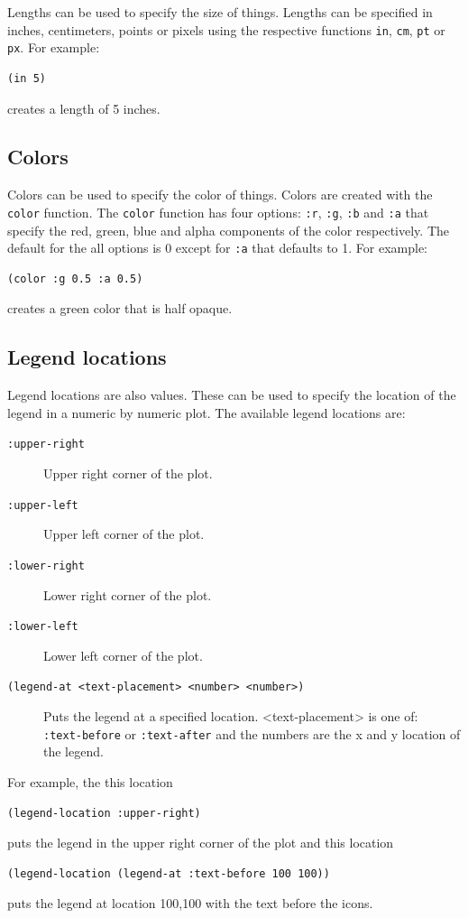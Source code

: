 \documentclass{article}
\begin{document}
Lengths can be used to specify the size of things.  Lengths can be
specified in inches, centimeters, points or pixels using the
respective functions {\tt in}, {\tt cm}, {\tt pt} or {\tt px}.  For
example:
\begin{verbatim}
(in 5)
\end{verbatim}
creates a length of 5 inches.

\subsection{Colors}

Colors can be used to specify the color of things.  Colors are created
with the {\tt color} function.  The {\tt color} function has four
options: {\tt :r}, {\tt :g}, {\tt :b} and {\tt :a} that specify the
red, green, blue and alpha components of the color respectively.  The
default for the all options is 0 except for {\tt :a} that defaults to
1. For example:
\begin{verbatim}
(color :g 0.5 :a 0.5)
\end{verbatim}
creates a green color that is half opaque.


\subsection{Legend locations}

Legend locations are also values.  These can be used to specify the
location of the legend in a numeric by numeric plot.  The available
legend locations are:
\begin{description}
\item[{\tt :upper-right}] Upper right corner of the plot.
\item[{\tt :upper-left}] Upper left corner of the plot.
\item[{\tt :lower-right}] Lower right corner of the plot.
\item[{\tt :lower-left}] Lower left corner of the plot.
\item[{\tt (legend-at <text-placement> <number> <number>)}] Puts the
  legend at a specified location.  <text-placement> is one of: {\tt
    :text-before} or {\tt :text-after} and the numbers are the x and y
  location of the legend.
\end{description}
For example, the this location
\begin{verbatim}
(legend-location :upper-right)
\end{verbatim}
puts the legend in the upper right corner of the plot and this
location
\begin{verbatim}
(legend-location (legend-at :text-before 100 100))
\end{verbatim}
puts the legend at location 100,100 with the text before the icons.
\end{document}

